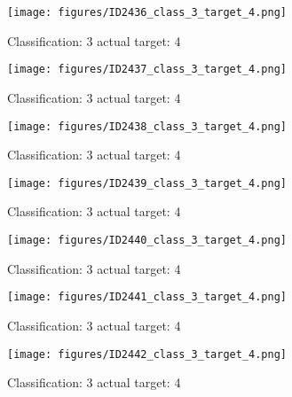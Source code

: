 \begin{figure}[h!]
\begin{center}
\texttt{[image: figures/ID2436\_class\_3\_target\_4.png]}
\end{center}
\caption{ Classification: 3 actual target: 4}
\label{fig:ID2436_class_3_target_4}
\end{figure}
\begin{figure}[h!]
\begin{center}
\texttt{[image: figures/ID2437\_class\_3\_target\_4.png]}
\end{center}
\caption{ Classification: 3 actual target: 4}
\label{fig:ID2437_class_3_target_4}
\end{figure}
\begin{figure}[h!]
\begin{center}
\texttt{[image: figures/ID2438\_class\_3\_target\_4.png]}
\end{center}
\caption{ Classification: 3 actual target: 4}
\label{fig:ID2438_class_3_target_4}
\end{figure}
\begin{figure}[h!]
\begin{center}
\texttt{[image: figures/ID2439\_class\_3\_target\_4.png]}
\end{center}
\caption{ Classification: 3 actual target: 4}
\label{fig:ID2439_class_3_target_4}
\end{figure}
\begin{figure}[h!]
\begin{center}
\texttt{[image: figures/ID2440\_class\_3\_target\_4.png]}
\end{center}
\caption{ Classification: 3 actual target: 4}
\label{fig:ID2440_class_3_target_4}
\end{figure}
\begin{figure}[h!]
\begin{center}
\texttt{[image: figures/ID2441\_class\_3\_target\_4.png]}
\end{center}
\caption{ Classification: 3 actual target: 4}
\label{fig:ID2441_class_3_target_4}
\end{figure}
\begin{figure}[h!]
\begin{center}
\texttt{[image: figures/ID2442\_class\_3\_target\_4.png]}
\end{center}
\caption{ Classification: 3 actual target: 4}
\label{fig:ID2442_class_3_target_4}
\end{figure}
